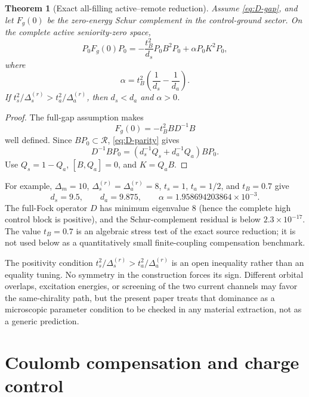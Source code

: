 \documentclass[11pt]{article}
\newtheorem{theorem}{Theorem}[section]
\theoremstyle{definition}
\theoremstyle{remark}
\newcommand{\cR}{\mathcal R}
\begin{document}
\begin{theorem}[Exact all-filling active--remote reduction]
\label{thm:all-filling}
Assume \eqref{eq:D-gap}, and let $F_g(0)$ be the zero-energy Schur complement in the control-ground sector.  On the complete active seniority-zero space,
\begin{equation}
 \boxed{P_0F_g(0)P_0=-\frac{t_B^2}{d_s}P_0B^2P_0+\alpha P_0K^2P_0,}
 \label{eq:all-filling-Schur}
\end{equation}
where
\begin{equation}
 \boxed{\alpha=t_B^2\left(\frac1{d_s}-\frac1{d_a}\right).}
 \label{eq:alpha-local}
\end{equation}
If $t_s^2/\Delta_s^{(r)}>t_a^2/\Delta_a^{(r)}$, then $d_s<d_a$ and $\alpha>0$.
\end{theorem}

\begin{proof}
The full-gap assumption makes
\begin{equation}
 F_g(0)=-t_B^2BD^{-1}B
\end{equation}
well defined.  Since $BP_0\subset\cR$, \eqref{eq:D-parity} gives
\begin{equation}
 D^{-1}BP_0=(d_s^{-1}Q_s+d_a^{-1}Q_a)BP_0.
\end{equation}
Use $Q_s=1-Q_a$, $[B,Q_a]=0$, and $K=Q_aB$.
\end{proof}

For example, $\Delta_m=10$, $\Delta_s^{(r)}=\Delta_a^{(r)}=8$, $t_s=1$, $t_a=1/2$, and $t_B=0.7$ give
\begin{equation}
 d_s=9.5,
 \qquad d_a=9.875,
 \qquad \alpha=1.958694203864\times10^{-3}.
\end{equation}
The full-Fock operator $D$ has minimum eigenvalue $8$ (hence the complete high control block is positive), and the Schur-complement residual is below $2.3\times10^{-17}$.  The value $t_B=0.7$ is an algebraic stress test of the exact source reduction; it is not used below as a quantitatively small finite-coupling compensation benchmark.

The positivity condition $t_s^2/\Delta_s^{(r)}>t_a^2/\Delta_a^{(r)}$ is an open inequality rather than an equality tuning.  No symmetry in the construction forces its sign.  Different orbital overlaps, excitation energies, or screening of the two current channels may favor the same-chirality path, but the present paper treats that dominance as a microscopic parameter condition to be checked in any material extraction, not as a generic prediction.

\section{Coulomb compensation and charge control}
\label{sec:charge}
\end{document}
